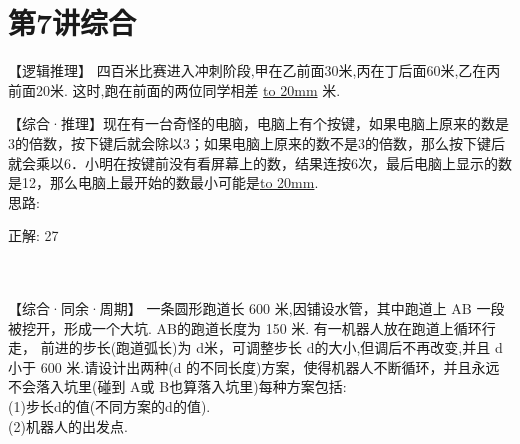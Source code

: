\section{第7讲\quad 综合}


\item {
    【逻辑推理】
    四百米比赛进入冲刺阶段,甲在乙前面30米,丙在丁后面60米,乙在丙前面20米. 这时,跑在前面的两位同学相差 \underline{\hbox to 20mm{}} 米.
    \vspace{2cm}
}

\item {
    【综合·推理】现在有一台奇怪的电脑，电脑上有个按键，如果电脑上原来的数是3的倍数，按下键后就会除以3；如果电脑上原来的数不是3的倍数，那么按下键后就会乘以6．小明在按键前没有看屏幕上的数，结果连按6次，最后电脑上显示的数是12，那么电脑上最开始的数最小可能是\underline{\hbox to 20mm{}}.
    \ifshowSolution
        \fangsong{}
        \\
        思路:

        正解: 27
    \else
        \\ \\ \\
    \fi
}

\item {
    【综合·同余·周期】
    一条圆形跑道长 600 米,因铺设水管，其中跑道上 AB 一段被挖开，形成一个大坑. AB的跑道长度为 150 米.  有一机器人放在跑道上循环行走， 前进的步长(跑道弧长)为 d米，可调整步长 d的大小,但调后不再改变,并且 d小于 600 米.请设计出两种(d 的不同长度)方案，使得机器人不断循环，并且永远不会落入坑里(碰到 A或 B也算落入坑里)每种方案包括:\\
    (1)步长d的值(不同方案的d的值). \\
    (2)机器人的出发点.
    \vspace{2cm}
}
